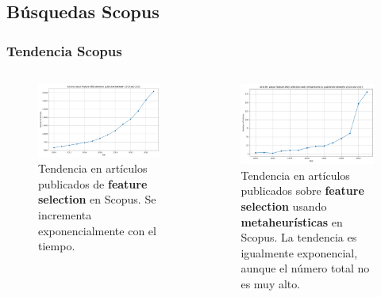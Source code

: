 \subsection{Búsquedas Scopus}
\begin{frame}
  \frametitle{Tendencia Scopus}
  \begin{columns}
    \begin{figure}
      \begin{center}
        \includegraphics[width=\textwidth]{imagenes/chapter3/scopus_chart.png}
      \end{center}
      \caption{Tendencia en artículos publicados de \textbf{feature selection} en Scopus. Se incrementa exponencialmente con el tiempo.}
    \end{figure}

    \begin{figure}
      \begin{center}
        \includegraphics[width=\textwidth]{imagenes/chapter3/scopus_chart2.png}
      \end{center}
      \caption{Tendencia en artículos publicados sobre \textbf{feature selection} usando \textbf{metaheurísticas} en Scopus. La tendencia es igualmente exponencial, aunque el número total no es muy alto.}
    \end{figure}
  \end{columns}
\end{frame}

